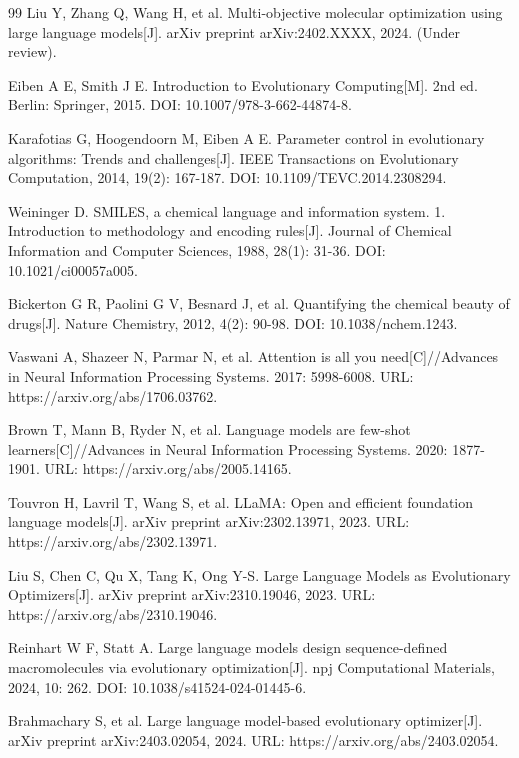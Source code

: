 \begin{thebibliography}{99}
Liu Y, Zhang Q, Wang H, et al. Multi-objective molecular optimization using large language models[J]. arXiv preprint arXiv:2402.XXXX, 2024. (Under review).

Eiben A E, Smith J E. Introduction to Evolutionary Computing[M]. 2nd ed. Berlin: Springer, 2015. DOI: 10.1007/978-3-662-44874-8.

Karafotias G, Hoogendoorn M, Eiben A E. Parameter control in evolutionary algorithms: Trends and challenges[J]. IEEE Transactions on Evolutionary Computation, 2014, 19(2): 167-187. DOI: 10.1109/TEVC.2014.2308294.

Weininger D. SMILES, a chemical language and information system. 1. Introduction to methodology and encoding rules[J]. Journal of Chemical Information and Computer Sciences, 1988, 28(1): 31-36. DOI: 10.1021/ci00057a005.

Bickerton G R, Paolini G V, Besnard J, et al. Quantifying the chemical beauty of drugs[J]. Nature Chemistry, 2012, 4(2): 90-98. DOI: 10.1038/nchem.1243.

Vaswani A, Shazeer N, Parmar N, et al. Attention is all you need[C]//Advances in Neural Information Processing Systems. 2017: 5998-6008. URL: https://arxiv.org/abs/1706.03762.

Brown T, Mann B, Ryder N, et al. Language models are few-shot learners[C]//Advances in Neural Information Processing Systems. 2020: 1877-1901. URL: https://arxiv.org/abs/2005.14165.

Touvron H, Lavril T, Wang S, et al. LLaMA: Open and efficient foundation language models[J]. arXiv preprint arXiv:2302.13971, 2023. URL: https://arxiv.org/abs/2302.13971.

Liu S, Chen C, Qu X, Tang K, Ong Y-S. Large Language Models as Evolutionary Optimizers[J]. arXiv preprint arXiv:2310.19046, 2023. URL: https://arxiv.org/abs/2310.19046.

Reinhart W F, Statt A. Large language models design sequence-defined macromolecules via evolutionary optimization[J]. npj Computational Materials, 2024, 10: 262. DOI: 10.1038/s41524-024-01445-6.

Brahmachary S, et al. Large language model-based evolutionary optimizer[J]. arXiv preprint arXiv:2403.02054, 2024. URL: https://arxiv.org/abs/2403.02054.


\end{thebibliography}
